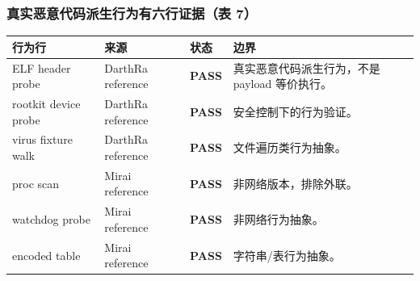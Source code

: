 \documentclass[aspectratio=169,10pt]{beamer}
\newcommand{\tagok}[1]{\textcolor{rvgreen}{\textbf{#1}}}
\begin{document}
\begin{frame}
  \frametitle{真实恶意代码派生行为有六行证据（表 7）}
  \vskip0.05cm
  \begin{center}\scriptsize
  \renewcommand{\arraystretch}{1.12}
  \begin{tabularx}{0.98\linewidth}{@{}L{3.45cm}L{2.35cm}L{1.05cm}Y@{}}
    \toprule
    \textbf{行为行} & \textbf{来源} & \textbf{状态} & \textbf{边界} \\
    \midrule
    ELF header probe & DarthRa reference & \tagok{PASS} & 真实恶意代码派生行为，不是 payload 等价执行。 \\
    rootkit device probe & DarthRa reference & \tagok{PASS} & 安全控制下的行为验证。 \\
    virus fixture walk & DarthRa reference & \tagok{PASS} & 文件遍历类行为抽象。 \\
    proc scan & Mirai reference & \tagok{PASS} & 非网络版本，排除外联。 \\
    watchdog probe & Mirai reference & \tagok{PASS} & 非网络行为抽象。 \\
    encoded table & Mirai reference & \tagok{PASS} & 字符串/表行为抽象。 \\
    \bottomrule
  \end{tabularx}
  \end{center}

  \vskip0.1cm
\end{frame}
\end{document}
